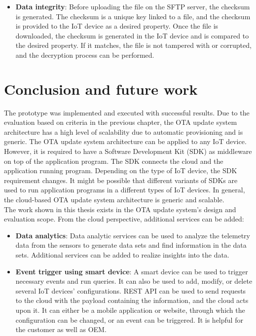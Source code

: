 \documentclass[12pt,a4paper]{article}
\begin{document}
{\begin{itemize}
\item \textbf{Data integrity}: Before uploading the file on the SFTP server, the checksum is generated. The checksum is a unique key linked to a file, and the checksum is provided to the IoT device as a desired property. Once the file is downloaded, the checksum is generated in the IoT device and is compared to the desired property. If it matches, the file is not tampered with or corrupted, and the decryption process can be performed. 

\end{itemize}


\newpage

\renewcommand{\baselinestretch}{1.5} %
\section{Conclusion and future work}

The prototype was implemented and executed with successful results. Due to the evaluation based on criteria in the previous chapter, the OTA update system architecture has a high level of scalability due to automatic provisioning and is generic. The OTA update system architecture can be applied to any IoT device. However, it is required to have a Software Development Kit (SDK) as middleware on top of the application program. The SDK connects the cloud and the application running program. Depending on the type of IoT device, the SDK requirement changes. It might be possible that different variants of SDKs are used to run application programs in a different types of IoT devices. In general, the cloud-based OTA update system architecture is generic and scalable. \\

The work shown in this thesis exists in the OTA update system's design and evaluation scope. From the cloud perspective, additional services can be added:

\begin{itemize}

\item \textbf{Data analytics}: Data analytic services can be used to analyze the telemetry data from the sensors to generate data sets and find information in the data sets. Additional services can be added to realize insights into the data.

\item \textbf{Event trigger using smart device}: A smart device can be used to trigger necessary events and run queries. It can also be used to add, modify, or delete several IoT devices' configurations. REST API can be used to send requests to the cloud with the payload containing the information, and the cloud acts upon it. It can either be a mobile application or website, through which the configuration can be changed, or an event can be triggered. It is helpful for the customer as well as OEM.


\end{itemize}}
\end{document}
